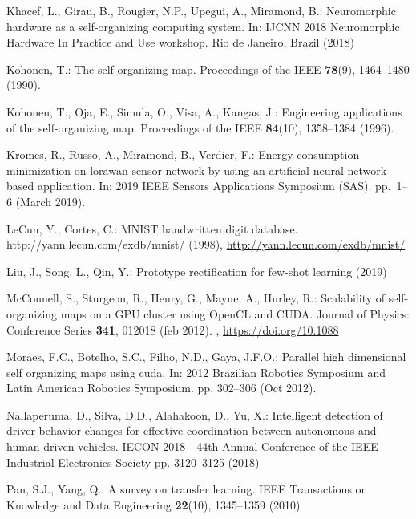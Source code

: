 \documentclass[runningheads]{llncs}
\begin{document}
\begin{thebibliography}{10}
Khacef, L., Girau, B., Rougier, N.P., Upegui, A., Miramond, B.: {Neuromorphic
  hardware as a self-organizing computing system}. In: {IJCNN 2018 Neuromorphic
  Hardware In Practice and Use workshop}. Rio de Janeiro, Brazil (2018)

Kohonen, T.: The self-organizing map. Proceedings of the IEEE  \textbf{78}(9),
  1464--1480 (1990). 

Kohonen, T., Oja, E., Simula, O., Visa, A., Kangas, J.: Engineering
  applications of the self-organizing map. Proceedings of the IEEE
  \textbf{84}(10),  1358--1384 (1996). 

{Kromes}, R., {Russo}, A., {Miramond}, B., {Verdier}, F.: Energy consumption
  minimization on lorawan sensor network by using an artificial neural network
  based application. In: 2019 IEEE Sensors Applications Symposium (SAS).
  pp.~1--6 (March 2019). 

LeCun, Y., Cortes, C.: {MNIST} handwritten digit database.
  http://yann.lecun.com/exdb/mnist/ (1998),
  \url{http://yann.lecun.com/exdb/mnist/}

Liu, J., Song, L., Qin, Y.: Prototype rectification for few-shot learning
  (2019)

McConnell, S., Sturgeon, R., Henry, G., Mayne, A., Hurley, R.: Scalability of
  self-organizing maps on a {GPU} cluster using {OpenCL} and {CUDA}. Journal of
  Physics: Conference Series  \textbf{341},  012018 (feb 2012).
  , \url{https://doi.org/10.1088}

{Moraes}, F.C., {Botelho}, S.C., {Filho}, N.D., {Gaya}, J.F.O.: Parallel high
  dimensional self organizing maps using cuda. In: 2012 Brazilian Robotics
  Symposium and Latin American Robotics Symposium. pp. 302--306 (Oct 2012).

Nallaperuma, D., Silva, D.D., Alahakoon, D., Yu, X.: Intelligent detection of
  driver behavior changes for effective coordination between autonomous and
  human driven vehicles. IECON 2018 - 44th Annual Conference of the IEEE
  Industrial Electronics Society pp. 3120--3125 (2018)

{Pan}, S.J., {Yang}, Q.: A survey on transfer learning. IEEE Transactions on
  Knowledge and Data Engineering  \textbf{22}(10),  1345--1359 (2010)


\end{thebibliography}
\end{document}

